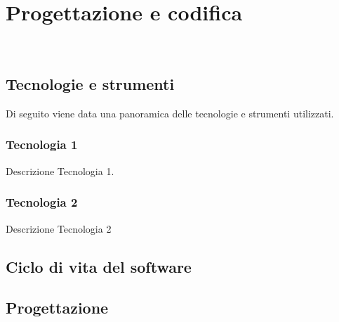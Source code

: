\chapter{Progettazione e codifica}
\label{cap:progettazione-codifica}

\\

\section{Tecnologie e strumenti}
\label{sec:tecnologie-strumenti}

Di seguito viene data una panoramica delle tecnologie e strumenti utilizzati.

\subsection*{Tecnologia 1}
Descrizione Tecnologia 1.

\subsection*{Tecnologia 2}
Descrizione Tecnologia 2

\section{Ciclo di vita del software}
\label{sec:ciclo-vita-software}

\section{Progettazione}
\label{sec:progettazione}

